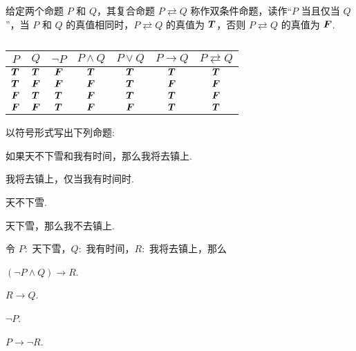 \begin{definition}[双条件]
    给定两个命题 $P$ 和 $Q$，其复合命题 $P \rightleftarrows Q$ 称作双条件命题，读作“$P$ 当且仅当 $Q$”，当 $P$ 和 $Q$ 的真值相同时，$P \rightleftarrows Q$ 的真值为 $\vb*{T}$，否则 $P \rightleftarrows Q$ 的真值为 $\vb*{F}$.
\end{definition}

\begin{table}[H]
    \centering
    \caption{}
    \begin{tabular}{c | c | c | c | c | c | c}
        $P$       & $Q$       & $\neg P$  & $P \wedge Q$ & $P\vee Q$ & $P\to Q$  & $P \rightleftarrows Q$ \\
        \midrule
        $\vb*{T}$ & $\vb*{T}$ & $\vb*{F}$ & $\vb*{T}$    & $\vb*{T}$ & $\vb*{T}$ & $\vb*{T}$              \\
        \midrule
        $\vb*{T}$ & $\vb*{F}$ & $\vb*{F}$ & $\vb*{F}$    & $\vb*{T}$ & $\vb*{F}$ & $\vb*{F}$              \\
        \midrule
        $\vb*{F}$ & $\vb*{T}$ & $\vb*{T}$ & $\vb*{F}$    & $\vb*{T}$ & $\vb*{T}$ & $\vb*{F}$              \\
        \midrule
        $\vb*{F}$ & $\vb*{F}$ & $\vb*{T}$ & $\vb*{F}$    & $\vb*{F}$ & $\vb*{T}$ & $\vb*{T}$              \\
    \end{tabular}
\end{table}

\begin{example}
    以符号形式写出下列命题:
    \begin{enumerate*}[label=(\arabic{*})]
        \item 如果天不下雪和我有时间，那么我将去镇上.
        \item 我将去镇上，仅当我有时间时.
        \item 天不下雪.
        \item 天下雪，那么我不去镇上.
    \end{enumerate*}
\end{example}
\begin{solution}
    令 $P:$ 天下雪，$Q:$ 我有时间，$R:$ 我将去镇上，那么
    \begin{enumerate*}[label=(\arabic{*})]
        \item $(\neg P\wedge Q)\to R$.
        \item $R\to Q$.
        \item $\neg P$.
        \item $P\to \neg R$.
    \end{enumerate*}
\end{solution}


